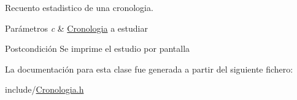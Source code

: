 Recuento estadistico de una cronologia. 


\begin{DoxyParams}{Parámetros}
{\em c} & \hyperlink{classCronologia}{Cronologia} a estudiar \\
\hline
\end{DoxyParams}
\begin{DoxyPostcond}{Postcondición}
Se imprime el estudio por pantalla 
\end{DoxyPostcond}


La documentación para esta clase fue generada a partir del siguiente fichero\+:\begin{DoxyCompactItemize}
\item 
include/\hyperlink{Cronologia_8h}{Cronologia.\+h}\end{DoxyCompactItemize}
